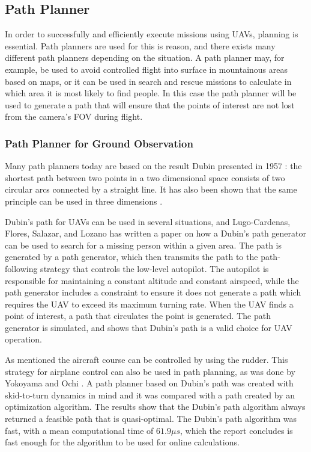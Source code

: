\subsection{Path Planner}

In order to successfully and efficiently execute missions using UAVs, planning is essential. Path planners are used for this is reason, and there exists many different path planners depending on the situation. A path planner may, for example, be used to avoid controlled flight into surface in mountainous areas based on maps, or it can be used in search and rescue missions to calculate in which area it is most likely to find people. In this case the path planner will be used to generate a path that will ensure that the points of interest are not lost from the camera's FOV during flight.


\subsubsection{Path Planner for Ground Observation}
\label{ch:path_literature}
Many path planners today are based on the result Dubin presented in 1957 \cite{DUBIN}: the shortest path between two points in a two dimensional space consists of two circular arcs connected by a straight line. It has also been shown that the same principle can be used in three dimensions \cite{dubinsBEARD}. 

Dubin's path for UAVs can be used in several situations, and Lugo-Cardenas, Flores, Salazar, and Lozano \cite{dubinFixedWingLUGO} has written a paper on how a Dubin's path generator can be used to search for a missing person within a given area. The path is generated by a path generator, which then transmits the path to the path-following strategy that controls the low-level autopilot. The autopilot is responsible for maintaining a constant altitude and constant airspeed, while the path generator includes a constraint to ensure it does not generate a path which requires the UAV to exceed its maximum turning rate. When the UAV finds a point of interest, a path that circulates the point is generated. The path generator is simulated, and shows that Dubin's path is a valid choice for UAV operation.

As mentioned the aircraft course can be controlled by using the rudder. This strategy for airplane control can also be used in path planning, as was done by Yokoyama and Ochi \cite{skidPathYOKO}. A path planner based on Dubin's path was created with skid-to-turn dynamics in mind and it was compared with a path created by an optimization algorithm. The results show that the Dubin's path algorithm always returned a feasible path that is quasi-optimal. The Dubin's path algorithm was fast, with a mean computational time of $61.9\mu s$, which the report concludes is fast enough for the algorithm to be used for online calculations.